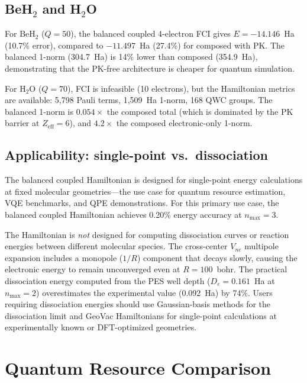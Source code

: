 \documentclass[twocolumn,pra,amsmath,amssymb,superscriptaddress]{revtex4-2}
\begin{document}
\subsection{BeH$_2$ and H$_2$O}

For BeH$_2$ ($Q=50$), the balanced coupled 4-electron FCI gives
$E=-14.146$~Ha (10.7\% error), compared to $-11.497$~Ha (27.4\%)
for composed with PK.  The balanced 1-norm (304.7~Ha) is 14\% lower
than composed (354.9~Ha), demonstrating that the PK-free architecture
is cheaper for quantum simulation.

For H$_2$O ($Q=70$), FCI is infeasible (10 electrons), but the
Hamiltonian metrics are available: 5{,}798 Pauli terms, 1{,}509~Ha
1-norm, 168 QWC groups.  The balanced 1-norm is $0.054\times$ the
composed total (which is dominated by the PK barrier at $Z_{\text{eff}}=6$),
and $4.2\times$ the composed electronic-only 1-norm.

\subsection{Applicability: single-point vs.\ dissociation}
\label{sec:applicability}

The balanced coupled Hamiltonian is designed for single-point energy
calculations at fixed molecular geometries---the use case for quantum
resource estimation, VQE benchmarks, and QPE demonstrations.  For this
primary use case, the balanced coupled Hamiltonian achieves 0.20\%
energy accuracy at $n_{\max}=3$.

The Hamiltonian is \emph{not} designed for computing dissociation curves
or reaction energies between different molecular species.  The
cross-center $V_{ne}$ multipole expansion includes a monopole ($1/R$)
component that decays slowly, causing the electronic energy to remain
unconverged even at $R = 100$~bohr.  The practical dissociation energy
computed from the PES well depth ($D_e = 0.161$~Ha at $n_{\max}=2$)
overestimates the experimental value (0.092~Ha) by 74\%.  Users
requiring dissociation energies should use Gaussian-basis methods for
the dissociation limit and GeoVac Hamiltonians for single-point
calculations at experimentally known or DFT-optimized geometries.

\section{Quantum Resource Comparison}
\label{sec:resources}
\end{document}
